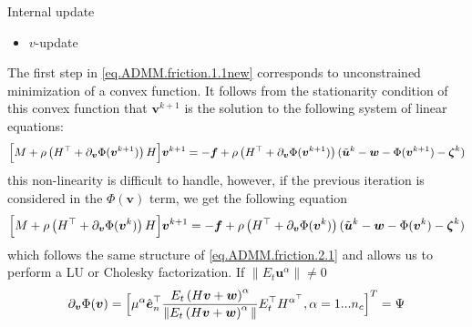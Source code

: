 \documentclass[8pt,red]{beamer}
\theoremstyle{plain}
\theoremstyle{definition}
\theoremstyle{remark}
\newcommand{\bi}[1]{\ensuremath{\boldsymbol{#1}}}
\begin{document}
\begin{frame}{Internal update}
\begin{itemize}
\item $v$-update
\end{itemize}
The first step in \eqref{eq.ADMM.friction.1.1new} corresponds to 
unconstrained minimization of a convex function. 
It follows from the stationarity condition of this convex 
function that $\bi{v}^{k+1}$ is the solution to the following system of 
linear equations: 
\begin{align}
  \Bigl[ M + 
  \rho \left( H^{\top} + \partial_{\bi{v}} \Phi(\bi{v}^{k+1}) \right) H \Bigr] \bi{v}^{k+1} 
  = -\bi{f} 
  + \rho \left( H^{\top} + \partial_{\bi{v}} \Phi(\bi{v}^{k+1}) \right) (\tilde{\bi{u}}^k - \bi{w} - \Phi(\bi{v}^{k+1}) - \bi{\zeta}^k)
\end{align}
this non-linearity is difficult to handle, however, if the previous iteration is considered in the $\Phi(\bi{v})$ term, we get the following equation
\begin{align}
  \Bigl[ M + 
  \rho \left( H^{\top} + \partial_{\bi{v}} \Phi(\bi{v}^{k}) \right) H \Bigr] \bi{v}^{k+1} 
  = -\bi{f} 
  + \rho \left( H^{\top} + \partial_{\bi{v}} \Phi(\bi{v}^{k}) \right) (\tilde{\bi{u}}^k - \bi{w} - \Phi(\bi{v}^{k}) - \bi{\zeta}^k)
\end{align}
which follows the same structure of \eqref{eq.ADMM.friction.2.1} and allows us to perform a LU or Cholesky factorization. If $\| E_{t} \bi{u}^{\alpha} \| \neq 0$
\begin{align}
  \partial_{\bi{v}} \Phi(\bi{v})
  = \Bigl[ \mu^{\alpha} \hat{\bi{e}}_{n}^{\top}
  \frac{E_{t} \left( H \bi{v} + \bi{w} \right)^{\alpha}}{\| E_{t} \left( H \bi{v} + \bi{w} \right)^{\alpha} \|}
  E_{t}^{\top} H^{\alpha^{\top}}, \alpha = 1...n_{c} \Bigr]^{T} = \Psi
\end{align}
\end{frame}
\end{document}
